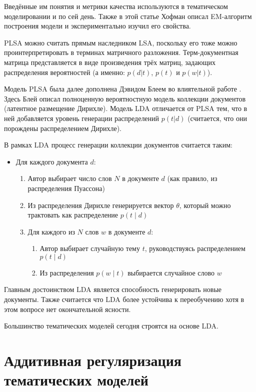 Введённые им понятия и метрики качества используются в тематическом моделировании и по сей день. Также в этой статье Хофман описал EM-алгоритм построения модели и экспериментально изучил его свойства.

PLSA можно считать прямым наследником LSA, поскольку его тоже можно проинтерпретировать в терминах матричного разложения. Терм-документная матрица представляется в виде произведения трёх матриц, задающих распределения вероятностей (а именно: $p(d|t)$, $p(t)$ и $p(w|t)$).

Модель PLSA была далее дополнена Дэвидом Блеем во влиятельной работе \cite{blei2003latent}. Здесь Блей описал полноценную вероятностную модель коллекции документов (латентное размещение Дирихле). Модель LDA отличается от PLSA тем, что в ней добавляется уровень генерации распределений $p(t|d)$ (считается, что они порождены распределением Дирихле).

В рамках LDA процесс генерации коллекции документов считается таким:

\begin{itemize}
    \item{Для каждого документа $d$:}
    \begin{enumerate}
    \item{Автор выбирает число слов $N$ в документе $d$ (как правило, из распределения Пуассона)}
    \item{Из распределения Дирихле генерируется вектор $\theta$, который можно трактовать как распределение $p(t \mid d)$}
    \item{Для каждого из $N$ слов $w$ в документе $d$:}
        \begin{enumerate}
        \item{Автор выбирает случайную тему $t$, руководствуясь распределением $p(t \mid d)$}
        \item{Из распределения $p(w \mid t)$ выбирается случайное слово $w$}
        \end{enumerate}
    \end{enumerate}
\end{itemize}

Главным достоинством LDA является способность генерировать новые документы. Также считается что LDA более устойчива к переобучению хотя в этом вопросе нет окончательной ясности.

Большинство тематических моделей сегодня строятся на основе LDA.

\section{Аддитивная регуляризация тематических моделей}

